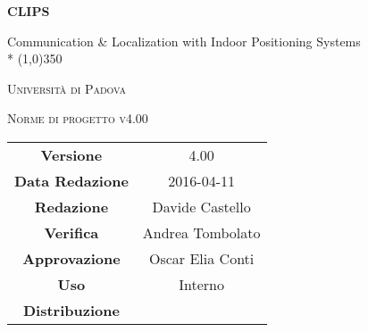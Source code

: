 \documentclass[a4paper,12pt]{article}
\author{Tavella Federico, Tombolato Andrea}
\date{04/03/2016}
\begin{document}
\begin{titlepage}
	\centering
	{\huge\bfseries CLIPS\par}
	Communication \& Localization with Indoor Positioning Systems \\*
	\line(1,0){350} \\
	{\scshape\LARGE Università di Padova \par}
	\vspace{1cm}
	{\scshape\Large Norme di progetto v4.00 \par}
	\logo
	\newpage
		\begin{tabular}{c|c}
			{\hfill \textbf{Versione}} 		& 4.00				\\
			{\hfill\textbf{Data Redazione}} 	& 2016-04-11		 	\\ 
			{\hfill\textbf{Redazione}} 		& Davide Castello		\\ 
			{\hfill\textbf{Verifica}} 		& Andrea Tombolato		\\
			{\hfill\textbf{Approvazione}} 		& Oscar Elia Conti		\\
			{\hfill\textbf{Uso}} 			& Interno			\\
			{\hfill\textbf{Distribuzione}} 		& \leaf				\\
		\end{tabular}
	\end{titlepage}
	\newpage
	\pagestyle{myfront}
	
		\newpage
			\tableofcontents
		\newpage
			\listoffigures	
	\label{LastFrontPage}
	\newpage
	\pagestyle{mymain}
         
    \newpage
		

	\newpage
		
	
	\newpage
		
	
	\newpage
		
		
	\label{LastPage}
\end{document}
